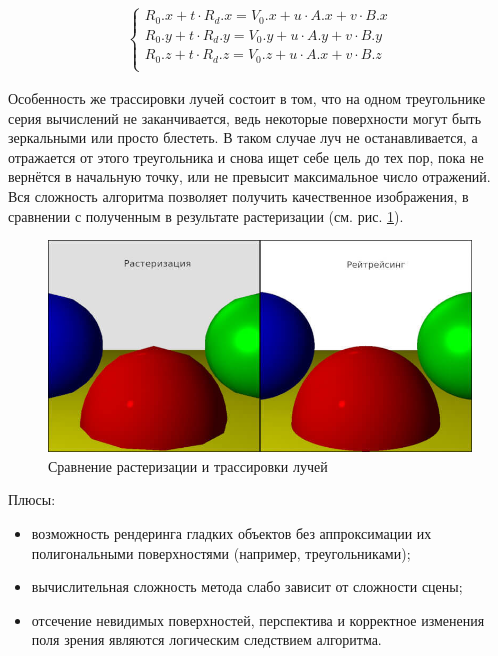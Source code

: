 \begin{eqndesc}
\begin{equation} \label{eq:system_for_coords}
\begin{aligned}
\begin{cases}
  R_0.x + t \cdot R_d.x = V_0.x + u \cdot A.x + v \cdot B.x \\
  R_0.y + t \cdot R_d.y = V_0.y + u \cdot A.y + v \cdot B.y \\
  R_0.z + t \cdot R_d.z = V_0.z + u \cdot A.x + v \cdot B.z \\
\end{cases}
\end{aligned}
\end{equation}
\end{eqndesc}

Особенность же трассировки лучей состоит в том, что на одном треугольнике серия вычислений не заканчивается, 
ведь некоторые поверхности могут быть зеркальными или просто блестеть. 
В таком случае луч не останавливается, а отражается от этого треугольника и снова ищет себе цель до тех пор, пока не вернётся в начальную точку, 
или не превысит максимальное число отражений.
Вся сложность алгоритма позволяет получить качественное изображения, в сравнении с полученным в результате растеризации (см. рис. \ref{fig:raster_vs_tracer}).

  \begin{figure}
  \centering
  \includegraphics[scale=0.5]{inc/img/raster_vs_tracer}
  \caption{Сравнение растеризации и трассировки лучей}
  \label{fig:raster_vs_tracer}
\end{figure}
\clearpage

Плюсы: 
\begin{itemize}
  \item возможность рендеринга гладких объектов без аппроксимации их полигональными поверхностями (например, треугольниками);
  \item вычислительная сложность метода слабо зависит от сложности сцены;
  \item отсечение невидимых поверхностей, перспектива и корректное изменения поля зрения являются логическим следствием алгоритма.
\end{itemize}

